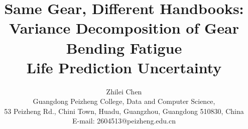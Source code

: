 \documentclass[12pt,a4paper]{article}
\begin{document}
\title{\textbf{Same Gear, Different Handbooks:\\
Variance Decomposition of Gear Bending Fatigue\\
Life Prediction Uncertainty}}

\author{Zhilei Chen\\
Guangdong Peizheng College, Data and Computer Science,\\
53 Peizheng Rd., Chini Town, Huadu, Guangzhou, Guangdong 510830, China\\
E-mail: 2604513@peizheng.edu.cn}

\maketitle

\end{document}
